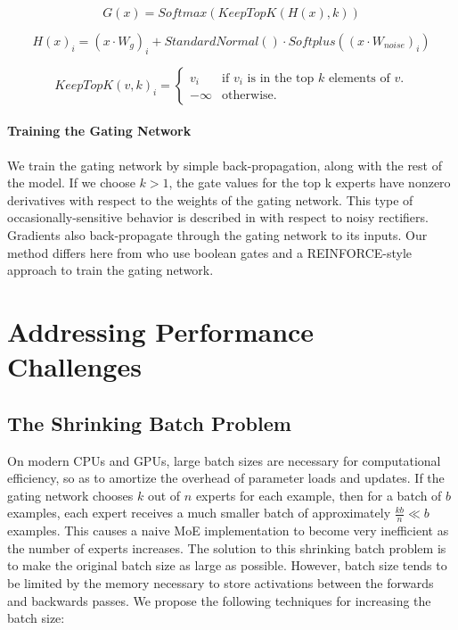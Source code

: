 \documentclass{article} %
\begin{document}
\begin{equation}\label{eq:g}
G(x) = Softmax(KeepTopK(H(x), k))
\end{equation}

\begin{equation}\label{eq:noise}
H(x)_i = (x \cdot W_g)_i + StandardNormal() \cdot Softplus((x \cdot W_{noise})_i)
\end{equation}

\begin{equation}\label{eq:keeptopk}
KeepTopK(v, k)_i = \begin{cases}
            v_i & \text{if $v_i$ is in the top $k$ elements of $v$.} \\
            -\infty & \text{otherwise.}
        \end{cases}
\end{equation}

\paragraph{Training the Gating Network}
We train the gating network by simple back-propagation, along with the rest of the model.  If we choose $k>1$, the gate values for the top k experts have nonzero derivatives with respect to the weights of the gating network.  This type of occasionally-sensitive behavior is described in \citep{Bengio13:CondComp} with respect to noisy rectifiers.  Gradients also back-propagate through the gating network to its inputs.   Our method differs here from \citep{Bengio15:CondComp} who use boolean gates and a REINFORCE-style approach to train the gating network. 



\section{Addressing Performance Challenges}
\label{sec:performance}
\subsection{The Shrinking Batch Problem}
On modern CPUs and GPUs, large batch sizes are necessary for computational efficiency, so as to amortize the overhead of parameter loads and updates.  If the gating network chooses $k$ out of $n$ experts for each example, then for a batch of $b$ examples, each expert receives a much smaller batch of approximately $\frac{kb}{n}\ll b$ examples.  This causes a naive MoE implementation to become very inefficient as the number of experts increases.  The solution to this shrinking batch problem is to make the original batch size as large as possible.  However, batch size tends to be limited by the memory necessary to store activations between the forwards and backwards passes.  We propose the following techniques for increasing the batch size:
\end{document}
